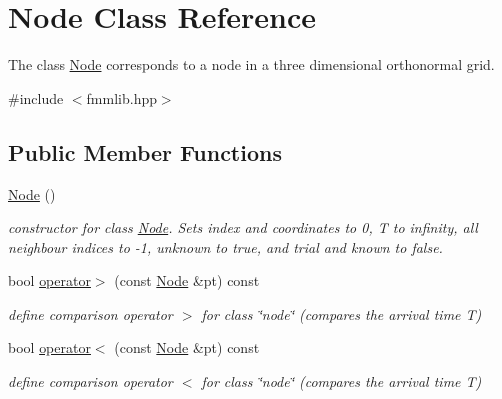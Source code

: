 \hypertarget{class_node}{}\section{Node Class Reference}
\label{class_node}


The class \hyperlink{class_node}{Node} corresponds to a node in a three dimensional orthonormal grid.  




{\ttfamily \#include $<$fmmlib.\+hpp$>$}

\subsection*{Public Member Functions}
\begin{DoxyCompactItemize}
\item 
\hypertarget{class_node_ad7a34779cad45d997bfd6d3d8043c75f}{}\hyperlink{class_node_ad7a34779cad45d997bfd6d3d8043c75f}{Node} ()\label{class_node_ad7a34779cad45d997bfd6d3d8043c75f}

\begin{DoxyCompactList}\small\item\em constructor for class \hyperlink{class_node}{Node}. Sets index and coordinates to 0, T to infinity, all neighbour indices to -\/1, unknown to true, and trial and known to false. \end{DoxyCompactList}\item 
\hypertarget{class_node_a95697fcac6323cbb7797e93a8127a8cb}{}bool \hyperlink{class_node_a95697fcac6323cbb7797e93a8127a8cb}{operator$>$} (const \hyperlink{class_node}{Node} \&pt) const \label{class_node_a95697fcac6323cbb7797e93a8127a8cb}

\begin{DoxyCompactList}\small\item\em define comparison operator $>$ for class \char`\"{}node\char`\"{} (compares the arrival time T) \end{DoxyCompactList}\item 
\hypertarget{class_node_aab685edaeba13503d356e496e567f34f}{}bool \hyperlink{class_node_aab685edaeba13503d356e496e567f34f}{operator$<$} (const \hyperlink{class_node}{Node} \&pt) const \label{class_node_aab685edaeba13503d356e496e567f34f}

\begin{DoxyCompactList}\small\item\em define comparison operator $<$ for class \char`\"{}node\char`\"{} (compares the arrival time T) \end{DoxyCompactList}\end{DoxyCompactItemize}
